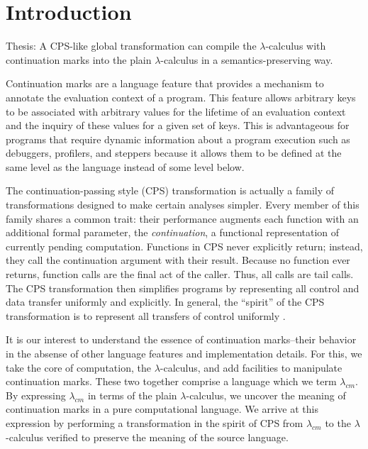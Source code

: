 \documentclass[ms,electronic,twosidetoc,letterpaper,chaptercenter,parttop]{byumsphd}
\title{\Title}
\author{\Author}
\begin{document}
\maketitle
{}

\chapter{Introduction}

Thesis: A CPS-like global transformation can compile the $\lambda$-calculus with
continuation marks into the plain $\lambda$-calculus in a semantics-preserving way.

Continuation marks \cite{clements2006portable} are a language feature that provides a
mechanism to annotate the evaluation context of a program. This feature allows
arbitrary keys to be associated with arbitrary values for the lifetime of an evaluation
context and the inquiry of these values for a given set of
keys. This is advantageous for programs that require dynamic information about a program
execution such as debuggers, profilers, and steppers because it allows them to be defined
at the same level as the language instead of some level below.

The continuation-passing style (CPS) transformation is actually a family of 
transformations designed to make certain analyses simpler. Every member of this 
family shares a common trait: their performance augments each function 
with an additional formal parameter, the \emph{continuation}, a 
functional representation of currently pending computation. Functions in CPS 
never explicitly return; instead, they call the continuation argument with their 
result. Because no function ever returns, function calls are the final act of the 
caller. Thus, all calls are tail calls.
The CPS transformation then simplifies programs by representing all control 
and data transfer uniformly and explicitly. In general, the ``spirit'' of the 
CPS transformation is to represent all transfers of control uniformly \cite{sabry1994formal}.

It is our interest to understand the essence of continuation marks--their behavior in the 
absense of other language features and implementation details. For this, we take the core 
of computation, the $\lambda$-calculus, and add facilities to manipulate continuation 
marks. These two together comprise a language which we term $\lambda_{cm}$. By expressing 
$\lambda_{cm}$ in terms of the plain $\lambda$-calculus, we uncover the meaning of 
continuation marks in a pure computational language. We arrive at this expression by 
performing a transformation in the spirit of CPS from $\lambda_{cm}$ to the $\lambda$-calculus 
verified to preserve the meaning of the source language.
\end{document}
